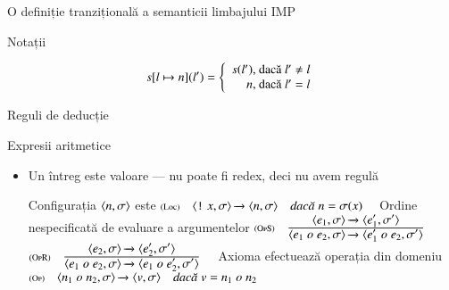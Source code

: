 \documentclass[handout,xcolor=pdftex,romanian,colorlinks]{beamer}
\begin{document}
\begin{section}{O definiție tranzițională a semanticii limbajului IMP}
\begin{subsection}
\begin{frame}
\begin{block}{Notații}
\begin{itemize}
$$s[l\mapsto n] (l') = \left\{\begin{array}{r@{\mbox{, dacă }}l}
s	(l') & l' \neq l \\
n & l' = l
\end{array}
\right.$$
\end{itemize}
\end{block}
\end{frame}

\end{subsection}
\begin{subsection}{Reguli de deducție}
\begin{frame}{Expresii aritmetice}
\begin{itemize}
\item Un întreg este valoare --- nu poate fi redex, deci nu avem regulă

\hfill Configurația ${\langle{n,\sigma}\rangle}$ este \hfill\; 
\vitem[] $\reg[Loc]{\Ss{\c{\terminal{!} x,\sigma}}{\c{n, \sigma}}}{}{n = \sigma(x)}$
\vitem Ordine nespecificată de evaluare a argumentelor
\vitem[] $\reg[OpS]{\Ss{\c{e_1 \mathrel{o} e_2,\sigma}}{\c{e_1' \mathrel{o} e_2,\sigma'}}}{\Ss{\c{e_1,\sigma}}{\c{e_1',\sigma'}}}{}$
\vitem[] $\reg[OpR]{\Ss{\c{e_1 \mathrel{o} e_2,\sigma}}{\c{e_1 \mathrel{o} e_2',\sigma'}}}{\Ss{\c{e_2,\sigma}}{\c{e_2',\sigma'}}}{}$
\vitem Axioma efectuează operația din domeniu 
\vitem[] $\reg[Op]{\Ss{\c{n_1 \mathrel{o} n_2,\sigma}}{\c{v,\sigma}}}{}{v = n_1 \mathrel{o} n_2}$
\end{itemize}
\end{frame}

\end{subsection}
\end{section}
\end{document}
